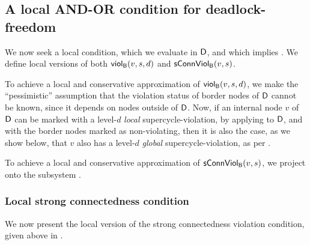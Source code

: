 

   \subsection{A local AND-OR condition for deadlock-freedom}
   \label{s:ANDORcond}
%   



We now seek a local condition, which we evaluate in $\dsk{\act}{\l}$, and which implies \GAO.
We define local versions of both $\scViol{v}{d}{s}$ and $\connViol{v}{s}$.

To achieve a local and conservative approximation of $\scViol{v}{d}{s}$, we make the ``pessimistic'' assumption that the violation status of border
nodes of $\dsk{\act}{\l}$ cannot be known, since it depends on nodes outside of $\dsk{\act}{\l}$.  Now, if an internal node $v$ of $\dsk{\act}{\l}$
can be marked with a level-$d$ \emph{local} supercycle-violation, by applying  to $\dsk{\act}{\l}$, and with the
border nodes marked as non-violating, then it is also the case, as we show below, that $v$ also has a level-$d$ \emph{global} supercycle-violation, as per .

To achieve a local and conservative approximation of
$\connViol{v}{s}$, we project onto the subsystem \DS.


\subsubsection{Local strong connectedness condition}

We now present the local version of the strong connectedness violation condition, given above in .

